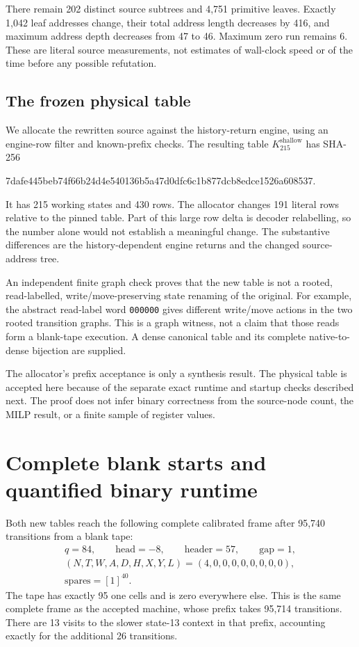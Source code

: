 \documentclass[11pt]{article}
\theoremstyle{definition}
\newcommand{\Ksh}{K_{215}^{\mathrm{shallow}}}
\newcommand{\code}[1]{\texttt{#1}}
\begin{document}
There remain 202 distinct source subtrees and 4,751 primitive leaves.
Exactly 1,042 leaf addresses change, their total address length decreases
by 416, and maximum address depth decreases from 47 to 46. Maximum zero
run remains 6. These are literal source measurements, not estimates of
wall-clock speed or of the time before any possible refutation.

\subsection{The frozen physical table}

We allocate the rewritten source against the history-return engine, using
an engine-row filter and known-prefix checks. The resulting table
\(\Ksh\) has SHA-256
\begin{center}\footnotesize\ttfamily
7dafe445beb74f66b24d4e540136b5a47d0dfc6c1b877dcb8edce1526a608537.
\end{center}
It has 215 working states and 430 rows. The allocator changes 191 literal
rows relative to the pinned table. Part of this large row delta is decoder
relabelling, so the number alone would not establish a meaningful change.
The substantive differences are the history-dependent engine returns and
the changed source-address tree.

An independent finite graph check proves that the new table is not a
rooted, read-labelled, write/move-preserving state renaming of the original.
For example, the abstract read-label word \code{000000} gives different
write/move actions in the two rooted transition graphs. This is a graph
witness, not a claim that those reads form a blank-tape execution. A dense
canonical table and its complete native-to-dense bijection are supplied.

The allocator's prefix acceptance is only a synthesis result. The physical
table is accepted here because of the separate exact runtime and startup
checks described next. The proof does not infer binary correctness from
the source-node count, the MILP result, or a finite sample of register
values.

\section{Complete blank starts and quantified binary runtime}
\label{sec:runtime}

Both new tables reach the following complete calibrated frame after
95,740 transitions from a blank tape:
\[
\begin{gathered}
q=84,\qquad \text{head}=-8,\qquad \text{header}=57,\qquad \text{gap}=1,\\
(N,T,W,A,D,H,X,Y,L)=(4,0,0,0,0,0,0,0,0),\\
\text{spares}=[1]^{40}.
\end{gathered}
\]
The tape has exactly 95 one cells and is zero everywhere else. This is the
same complete frame as the accepted machine, whose prefix takes 95,714
transitions. There are 13 visits to the slower state-13 context in that
prefix, accounting exactly for the additional 26 transitions.
\end{document}
